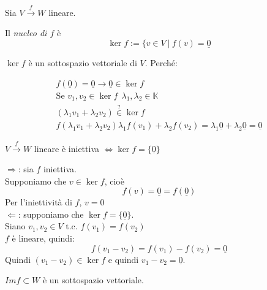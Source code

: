 Sia $V\xrightarrow{f} W$ lineare.
\begin{definizione}[]
    Il \textit{nucleo di $f$}  è
    \begin{equation}
        \ker f:=\{v\in V\ |\ f(v)=\underline{0}
        \label{eq:nucleo}
    \end{equation}
\end{definizione}
\begin{osservazione}[]
    $\ker f$ è un sottospazio vettoriale di $V$.
    Perché:
    \begin{dimostrazione}[]
        \begin{gather}
            f(\underline{0})=\underline{0}\rightarrow \underline{0}\in \ker f \\
            \text{Se }v_1,v_2\in \ker f\ \ \lambda_1,\lambda_2\in \mathbb{K}\\
            (\lambda_1v_1+\lambda_2v_2)\overset{?}{\in}\ker f \\
            f(\lambda_1v_1+\lambda_2v_2)\lambda_1f(v_1)+\lambda_2f(v_2)=\lambda_1\underline{0}+\lambda_2\underline{0}=\underline{0}
        \end{gather}
    \end{dimostrazione}
\end{osservazione}
\begin{proposizione}
    $V\xrightarrow{f} W$ lineare è iniettiva $\iff\ker f=\{\underline{0}\}$
\end{proposizione}
\begin{dimostrazione}[]
    $\Rightarrow$: sia $f$ iniettiva. \\
    Supponiamo che $v\in\ker f$, cioè
    \begin{equation}
        f(v)=\underline{0}=f(\underline{0})
    \end{equation}
    Per l'iniettività di $f$, $v=0$ \\
    $\Leftarrow$: supponiamo che $\ker f=\{\underline{0}\}$. \\
    Siano $v_1,v_2\in V$ t.c. $f(v_1)=f(v_2)$ \\
    $f$ è lineare, quindi:
    \begin{equation}
        f(v_1-v_2)=f(v_1)-f(v_2)=\underline{0}
    \end{equation}
    Quindi $(v_1-v_2)\in\ker f$ e quindi $v_1-v_2=\underline{0}$.
\end{dimostrazione}
\begin{osservazione}[]
    $Im f\subset W$  è un sottospazio vettoriale.
\end{osservazione}
